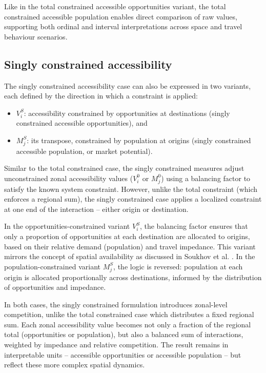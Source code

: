 \documentclass[
  10pt,
  letterpaper,
]{article}
\providecommand{\tightlist}{%
  \setlength{\itemsep}{0pt}\setlength{\parskip}{0pt}}\usepackage{longtable,booktabs,array}
\begin{document}
Like in the total constrained accessible opportunities variant, the
total constrained accessible population enables direct comparison of raw
values, supporting both ordinal and interval interpretations across
space and travel behaviour scenarios.

\subsection{Singly constrained
accessibility}\label{singly-constrained-accessibility}

The singly constrained accessibility case can also be expressed in two
variants, each defined by the direction in which a constraint is
applied:

\begin{itemize}
\tightlist
\item
  \(V_i^S\): accessibility constrained by opportunities at destinations
  (singly constrained accessible opportunities), and
\item
  \(M_j^S\): its transpose, constrained by population at origins (singly
  constrained accessible population, or market potential).
\end{itemize}

Similar to the total constrained case, the singly constrained measures
adjust unconstrained zonal accessibility values (\(V_i^0\) or \(M_j^0\))
using a balancing factor to satisfy the known system constraint.
However, unlike the total constraint (which enforces a regional sum),
the singly constrained case applies a localized constraint at one end of
the interaction -- either origin or destination.

In the opportunities-constrained variant \(V_i^S\), the balancing factor
ensures that only a proportion of opportunities at each destination are
allocated to origins, based on their relative demand (population) and
travel impedance. This variant mirrors the concept of spatial
availability as discussed in Soukhov et al.
\citep{soukhovIntroducingSpatialAvailability2023}. In the
population-constrained variant \(M_j^S\), the logic is reversed:
population at each origin is allocated proportionally across
destinations, informed by the distribution of opportunities and
impedance.

In both cases, the singly constrained formulation introduces zonal-level
competition, unlike the total constrained case which distributes a fixed
regional sum. Each zonal accessibility value becomes not only a fraction
of the regional total (opportunities or population), but also a balanced
sum of interactions, weighted by impedance and relative competition. The
result remains in interpretable units -- accessible opportunities or
accessible population -- but reflect these more complex spatial
dynamics.
\end{document}

